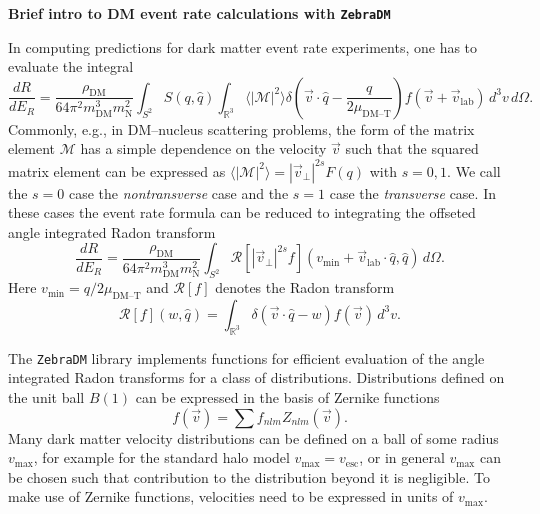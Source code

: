 \documentclass{article}
\newcommand{\der}[2]{\frac{d#1}{d#2}}
\newcommand{\unitv}[1]{\hat{#1}}
\newcommand{\mean}[1]{\langle #1 \rangle}
\newcommand{\difd}{\,d}
\begin{document}
\begin{center}
\large\textbf{Brief intro to DM event rate calculations with \texttt{ZebraDM}}
\end{center}

\noindent
In computing predictions for dark matter event rate experiments, one has to evaluate the integral
\begin{equation}
    \der{R}{E_R} = \frac{\rho_\text{DM}}{64\pi^2m_\text{DM}^3m_\text{N}^2}\int_{S^2}S(q, \unitv{q})\int_{\mathbb{R}^3}\mean{|\mathcal{M}|^2} \delta\left(\vec{v}\cdot\unitv{q}-\frac{q}{2\mu_\text{DM--T}}\right)f(\vec{v}+\vec{v}_\text{lab})\difd^3v \difd\Omega.
\end{equation}
Commonly, e.g., in DM--nucleus scattering problems, the form of the matrix element $\mathcal{M}$ has a simple dependence on the velocity $\vec{v}$ such that the squared matrix element can be expressed as $\mean{|\mathcal{M}|^2}=|\vec{v}_\perp|^{2s}F(q)$ with $s=0,1$. We call the $s=0$ case the \emph{nontransverse} case and the $s=1$ case the \emph{transverse} case. In these cases the event rate formula can be reduced to integrating the offseted angle integrated Radon transform
\begin{equation}
    \der{R}{E_R} = \frac{\rho_\text{DM}}{64\pi^2m_\text{DM}^3m_\text{N}^2}\int_{S^2}\mathcal{R}[|\vec{v}_\perp|^{2s}f](v_\text{min}+\vec{v}_\text{lab}\cdot\unitv{q}, \unitv{q})\difd\Omega.
\end{equation}
Here $v_\text{min}=q/2\mu_\text{DM--T}$ and $\mathcal{R}[f]$ denotes the Radon transform
\begin{equation}
    \mathcal{R}[f](w, \unitv{q}) = \int_{\mathbb{R}^3}\delta(\vec{v}\cdot \unitv{q}-w)f(\vec{v})\difd^3v.
\end{equation}

The \texttt{ZebraDM} library implements functions for efficient evaluation of the angle integrated Radon transforms for a class of distributions. Distributions defined on the unit ball $B(1)$ can be expressed in the basis of Zernike functions
\begin{equation}
    f(\vec{v})=\sum f_{nlm}Z_{nlm}(\vec{v}).
\end{equation}
Many dark matter velocity distributions can be defined on a ball of some radius $v_\text{max}$, for example for the standard halo model $v_\text{max}=v_\text{esc}$, or in general $v_\text{max}$ can be chosen such that contribution to the distribution beyond it is negligible. To make use of Zernike functions, velocities need to be expressed in units of $v_\text{max}$.
\end{document}
